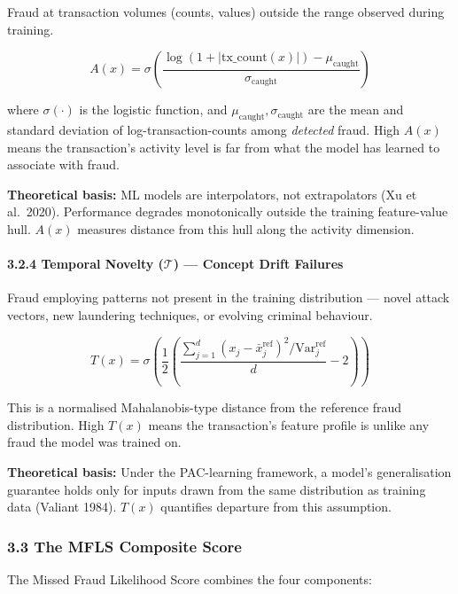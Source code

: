 \documentclass[
  11pt,
]{article}
\begin{document}
Fraud at transaction volumes (counts, values) outside the range observed
during training.

\[A(x) = \sigma\!\left(\frac{\log(1 + |\text{tx\_count}(x)|) - \mu_{\text{caught}}}{\sigma_{\text{caught}}}\right)\]

where \(\sigma(\cdot)\) is the logistic function, and
\(\mu_{\text{caught}}, \sigma_{\text{caught}}\) are the mean and
standard deviation of log-transaction-counts among \emph{detected}
fraud. High \(A(x)\) means the transaction’s activity level is far from
what the model has learned to associate with fraud.

\textbf{Theoretical basis:} ML models are interpolators, not
extrapolators (Xu et al.~2020). Performance degrades monotonically
outside the training feature-value hull. \(A(x)\) measures distance from
this hull along the activity dimension.

\paragraph{\texorpdfstring{3.2.4 Temporal Novelty (\(\mathcal{T}\)) —
Concept Drift
Failures}{3.2.4 Temporal Novelty (\textbackslash mathcal\{T\}) — Concept Drift Failures}}\label{temporal-novelty-mathcalt-concept-drift-failures}

Fraud employing patterns not present in the training distribution —
novel attack vectors, new laundering techniques, or evolving criminal
behaviour.

\[T(x) = \sigma\!\left(\frac{1}{2}\left(\frac{\sum_{j=1}^{d}(x_j - \bar{x}_j^{\text{ref}})^2 / \text{Var}_j^{\text{ref}}}{d} - 2\right)\right)\]

This is a normalised Mahalanobis-type distance from the reference fraud
distribution. High \(T(x)\) means the transaction’s feature profile is
unlike any fraud the model was trained on.

\textbf{Theoretical basis:} Under the PAC-learning framework, a model’s
generalisation guarantee holds only for inputs drawn from the same
distribution as training data (Valiant 1984). \(T(x)\) quantifies
departure from this assumption.

\subsubsection{3.3 The MFLS Composite
Score}\label{the-mfls-composite-score}

The Missed Fraud Likelihood Score combines the four components:
\end{document}
